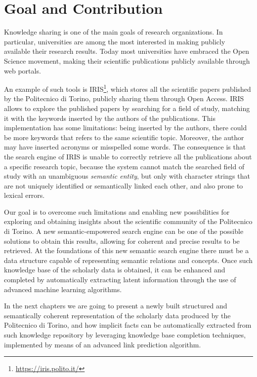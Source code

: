 \documentclass[%
    corpo=13.5pt,
    twoside,
    oldstyle,
    tipotesi=magistrale,
    greek,
    evenboxes
]{toptesi}
\begin{document}
\section{Goal and Contribution}

Knowledge sharing is one of the main goals of research organizations. In
particular, universities are among the most interested in making publicly
available their research results. Today most universities have embraced the Open
Science movement, making their scientific publications publicly available
through web portals.

An example of such tools is IRIS\footnote{\url{https://iris.polito.it/}}, which
stores all the scientific papers published by the Politecnico di Torino,
publicly sharing them through Open Access.
IRIS allows to explore the published papers by searching for a field of study,
matching it with the keywords inserted by the authors of the publications.
This implementation has some limitations: being inserted by the authors, there
could be more keywords that refers to the same scientific topic.
Moreover, the author may have inserted acronyms or misspelled some words.
The consequence is that the search engine of IRIS is unable to correctly
retrieve all the publications about a specific research topic, because the
system cannot match the searched field of study with an unambiguous
\emph{semantic entity}, but only with character strings that are not
uniquely identified or semantically linked each other, and also prone to
lexical errors.

Our goal is to overcome such limitations and enabling new possibilities for
exploring and obtaining insights about the scientific community of the
Politecnico di Torino. A new semantic-empowered search engine can be
one of the possible solutions to obtain this results, allowing for coherent and
precise results to be retrieved.
At the foundations of this new semantic search engine there must be a data
structure capable of representing semantic relations and concepts. Once such
knowledge base of the scholarly data is obtained, it can be enhanced and
completed by automatically extracting latent information through the use of
advanced machine learning algorithms.

In the next chapters we are going to present a newly built structured and
semantically coherent representation of the scholarly data produced by the
Politecnico di Torino, and how implicit facts can be automatically
extracted from such knowledge repository by leveraging knowledge base
completion techniques, implemented by means of an advanced link prediction
algorithm.
\end{document}
